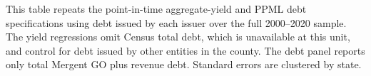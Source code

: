 \newpage
\begin{table}[H]\centering
\caption{\textbf{Aggregate Yields and Debt: Full-Period Issuer Aggregates}}
\label{tab:issuer_yields_full_sample_issuer_aggregate}
\parbox{\textwidth}{This table repeats the point-in-time aggregate-yield and PPML debt specifications using debt issued by each issuer over the full 2000--2020 sample. The yield regressions omit Census total debt, which is unavailable at this unit, and control for debt issued by other entities in the county. The debt panel reports only total Mergent GO plus revenue debt. Standard errors are clustered by state.}
\end{table}

\vspace{10pt}

